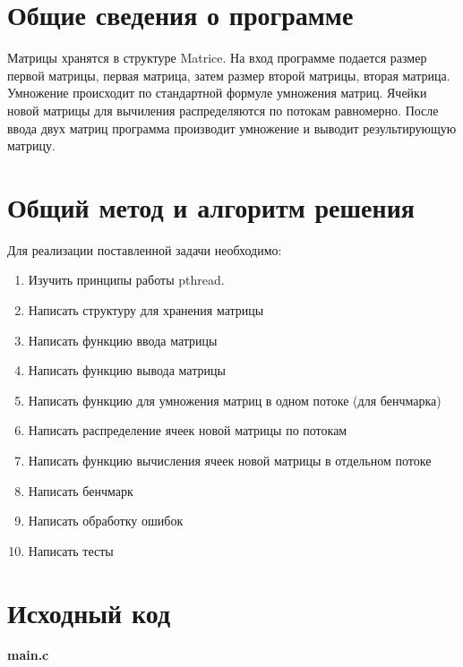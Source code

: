\section{Общие сведения о программе}

Матрицы хранятся в структуре Matrice. На вход программе подается размер первой матрицы, первая матрица, затем размер второй матрицы, вторая матрица. Умножение происходит по стандартной формуле умножения матриц. Ячейки новой матрицы для вычиления распределяются по потокам равномерно. После ввода двух матриц программа производит умножение и выводит результирующую матрицу.

\pagebreak

\section{Общий метод и алгоритм решения}

Для реализации поставленной задачи необходимо:

\begin{enumerate}
    \item Изучить принципы работы pthread.
    \item Написать структуру для хранения матрицы
    \item Написать функцию ввода матрицы
    \item Написать функцию вывода матрицы
    \item Написать функцию для умножения матриц в одном потоке (для бенчмарка)
    \item Написать распределение ячеек новой матрицы по потокам
    \item Написать функцию вычисления ячеек новой матрицы в отдельном потоке
    \item Написать бенчмарк
    \item Написать обработку ошибок
    \item Написать тесты
\end{enumerate}

\pagebreak

\section{Исходный код}

\textbf{main.c}

